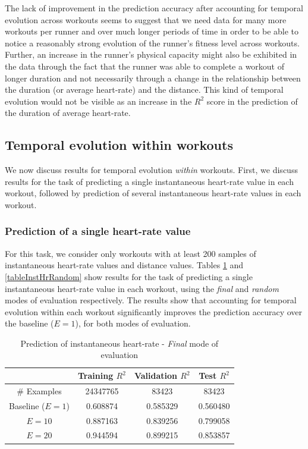 \documentclass{acm_proc_article-sp}
\begin{document}
The lack of improvement in the prediction accuracy after accounting for temporal evolution across workouts seems to suggest that we need data for many more workouts per runner and over much longer periods of time in order to be able to notice a reasonably strong evolution of the runner's fitness level across workouts. Further, an increase in the runner's physical capacity might also be exhibited in the data through the fact that the runner was able to complete a workout of longer duration and not necessarily through a change in the relationship between the duration (or average heart-rate) and the distance. This kind of temporal evolution would not be visible as an increase in the $R^2$ score in the prediction of the duration of average heart-rate.

\subsection{Temporal evolution within workouts}

We now discuss results for temporal evolution \emph{within} workouts. First, we discuss results for the task of predicting a single instantaneous heart-rate value in each workout, followed by prediction of several instantaneous heart-rate values in each workout.

\subsubsection{Prediction of a single heart-rate value}

For this task, we consider only workouts with at least 200 samples of instantaneous heart-rate values and distance values. Tables \ref{tableInstHrFinal} and \ref{tableInstHrRandom} show results for the task of predicting a single instantaneous heart-rate value in each workout, using the \emph{final} and \emph{random} modes of evaluation respectively. The results show that accounting for temporal evolution within each workout significantly improves the prediction accuracy over the baseline ($E = 1$), for both modes of evaluation.

\begin{table}[H]
\centering
\begin{tabular}{|c|c|c|c|} \hline
& Training $R^2$ & Validation $R^2$ & Test $R^2$ \\ \hline
\# Examples & 24347765 & 83423  & 83423  \\ \hline
Baseline ($E = 1$) & 0.608874 & 0.585329 & 0.560480 \\ \hline
$E = 10$ & 0.887163 & 0.839256 & 0.799058 \\ \hline
$E = 20$ & 0.944594 & 0.899215 & 0.853857  \\ \hline
\end{tabular}
\caption{Prediction of instantaneous heart-rate - \emph{Final} mode of evaluation }
\label{tableInstHrFinal}
\end{table}
\end{document}
